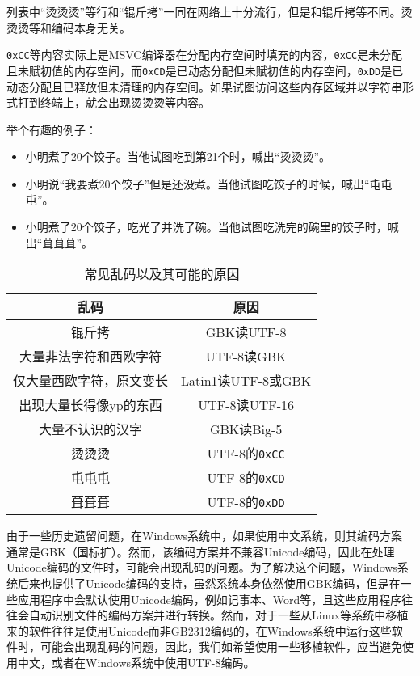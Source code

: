 \begin{note}
  列表中“烫烫烫”等行和“锟斤拷”一同在网络上十分流行，但是和锟斤拷等不同。烫烫烫等和编码本身无关。
  
  \texttt{0xCC}等内容实际上是MSVC编译器在分配内存空间时填充的内容，\texttt{0xCC}是未分配且未赋初值的内存空间，而\texttt{0xCD}是已动态分配但未赋初值的内存空间，\texttt{0xDD}是已动态分配且已释放但未清理的内存空间。如果试图访问这些内存区域并以字符串形式打到终端上，就会出现烫烫烫等内容。

  举个有趣的例子：
  \begin{itemize}
    \item 小明煮了20个饺子。当他试图吃到第21个时，喊出“烫烫烫”。
    \item 小明说“我要煮20个饺子”但是还没煮。当他试图吃饺子的时候，喊出“屯屯屯”。
    \item 小明煮了20个饺子，吃光了并洗了碗。当他试图吃洗完的碗里的饺子时，喊出“葺葺葺”。
  \end{itemize}
\end{note}

\begin{table}[ht]
  \centering
  \caption{常见乱码以及其可能的原因}
  \begin{tabular}{c|c}
    \toprule
    乱码 & 原因 \\
    \midrule
    锟斤拷 & GBK读UTF-8 \\
    大量非法字符和西欧字符 & UTF-8读GBK \\
    仅大量西欧字符，原文变长 & Latin1读UTF-8或GBK \\
    出现大量长得像yp的东西 & UTF-8读UTF-16 \\
    大量不认识的汉字 & GBK读Big-5 \\
    \midrule
    烫烫烫 & UTF-8的\texttt{0xCC}\\
    屯屯屯 & UTF-8的\texttt{0xCD}\\
    葺葺葺 & UTF-8的\texttt{0xDD}\\
    \bottomrule
  \end{tabular}
\end{table}

由于一些历史遗留问题，在Windows系统中，如果使用中文系统，则其编码方案通常是GBK（国标扩）。然而，该编码方案并不兼容Unicode编码，因此在处理Unicode编码的文件时，可能会出现乱码的问题。为了解决这个问题，Windows系统后来也提供了Unicode编码的支持，虽然系统本身依然使用GBK编码，但是在一些应用程序中会默认使用Unicode编码，例如记事本、Word等，且这些应用程序往往会自动识别文件的编码方案并进行转换。然而，对于一些从Linux等系统中移植来的软件往往是使用Unicode而非GB2312编码的，在Windows系统中运行这些软件时，可能会出现乱码的问题，因此，我们如希望使用一些移植软件，应当避免使用中文，或者在Windows系统中使用UTF-8编码。

